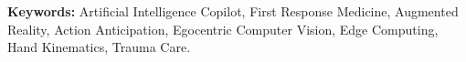\documentclass[12pt,a4paper]{report}
\begin{document}
\vspace{0.6cm}
\noindent
\textbf{Keywords:} Artificial Intelligence Copilot, First Response Medicine, Augmented Reality, Action Anticipation, Egocentric Computer Vision, Edge Computing, Hand Kinematics, Trauma Care.

\newpage
{}
\tableofcontents

\newpage
{}
\listoftables

\newpage
{}
\listoffigures

\newpage
{}
\end{document}
